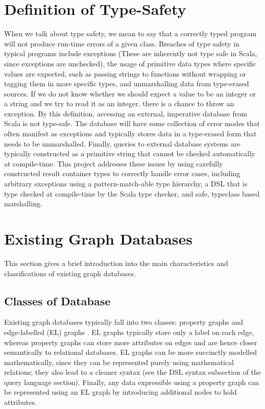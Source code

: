 \documentclass[12pt,a4paper,twoside,openright]{report}
\begin{document}
\section{Definition of Type-Safety}
When we talk about type safety, we mean to say that a correctly typed program will not produce run-time errors of a given class. Breaches of  type safety in typical programs include exceptions (These are inherently not type safe in Scala, since exceptions are unchecked), the usage of primitive data types where specific values are expected, such as passing strings to functions without wrapping or tagging them in more specific types, and unmarshalling data from type-erased sources. If we do not know whether we should expect a value to be an integer or a string and we try to read it as an integer, there is a chance to throw an exception. 
By this definition, accessing an external, imperative database from Scala is not type-safe. The database will have some collection of error modes that often manifest as exceptions and typically stores data in a type-erased form that needs to be unmarshalled. Finally, queries to external database systems are typically constructed as a primitive string that cannot be checked automatically at compile-time. This project addresses these issues by using carefully constructed result container types to correctly handle error cases, including arbitrary exceptions using a pattern-match-able type hierarchy, a DSL that is type checked at compile-time by the Scala type checker, and safe, typeclass based marshalling.


\section{Existing Graph Databases}
This section gives a brief introduction into the main characteristics and classifications of existing graph databases.
\subsection{Classes of Database}
Existing graph databases typically fall into two classes: property graphs and edge-labelled (EL) graphs \cite{QueryLanguageFoundations}. EL graphs typically store only a label on each edge, whereas property graphs can store more attributes on edges and are hence closer semantically to relational databases. EL graphs can be more succinctly modelled mathematically, since they can be represented purely using mathematical relations; they also lead to a cleaner syntax (see the DSL syntax subsection of the query language section). Finally, any data expressible using a property graph can be represented using an EL graph by introducing additional nodes to hold attributes.
\end{document}
